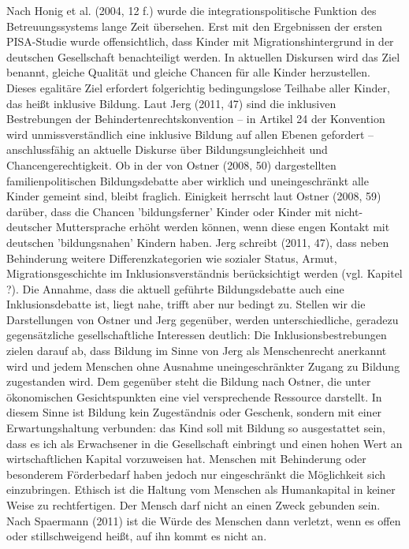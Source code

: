 Nach Honig et al. (2004, 12 f.) wurde die integrationspolitische Funktion des Betreuungssystems lange Zeit übersehen. Erst mit den Ergebnissen der ersten PISA-Studie wurde offensichtlich, dass Kinder mit Migrationshintergrund in der deutschen Gesellschaft benachteiligt werden. In aktuellen Diskursen wird das Ziel benannt, gleiche Qualität und gleiche Chancen für alle Kinder herzustellen. Dieses egalitäre Ziel erfordert folgerichtig bedingungslose Teilhabe aller Kinder, das heißt inklusive Bildung. Laut Jerg (2011, 47) sind die inklusiven Bestrebungen der Behindertenrechtskonvention – in Artikel 24 der Konvention wird unmissverständlich eine inklusive Bildung auf allen Ebenen gefordert – anschlussfähig an aktuelle Diskurse über Bildungsungleichheit und Chancengerechtigkeit. Ob in der von Ostner (2008, 50) dargestellten familienpolitischen Bildungsdebatte aber wirklich und uneingeschränkt alle Kinder gemeint sind, bleibt fraglich. Einigkeit herrscht laut Ostner (2008, 59) darüber, dass die Chancen 'bildungsferner' Kinder oder Kinder mit nicht-deutscher Muttersprache erhöht werden können, wenn diese engen Kontakt mit deutschen 'bildungsnahen' Kindern haben. Jerg schreibt (2011, 47), dass neben Behinderung weitere Differenzkategorien wie sozialer Status, Armut, Migrationsgeschichte im Inklusionsverständnis berücksichtigt werden (vgl. Kapitel ?). Die Annahme, dass die aktuell geführte Bildungsdebatte auch eine Inklusionsdebatte ist, liegt nahe, trifft aber nur bedingt zu. Stellen wir die Darstellungen von Ostner und Jerg gegenüber, werden unterschiedliche, geradezu gegensätzliche gesellschaftliche Interessen deutlich: Die Inklusionsbestrebungen zielen darauf ab, dass Bildung im Sinne von Jerg als Menschenrecht anerkannt wird und jedem Menschen ohne Ausnahme uneingeschränkter Zugang zu Bildung zugestanden wird. Dem gegenüber steht die Bildung nach Ostner, die unter ökonomischen Gesichtspunkten eine viel versprechende Ressource darstellt. In diesem Sinne ist Bildung kein Zugeständnis oder Geschenk, sondern mit einer Erwartungshaltung verbunden: das Kind soll mit Bildung so ausgestattet sein, dass es ich als Erwachsener in die Gesellschaft einbringt und einen hohen Wert an wirtschaftlichen Kapital vorzuweisen hat. Menschen mit Behinderung oder besonderem Förderbedarf haben jedoch nur eingeschränkt die Möglichkeit sich einzubringen. Ethisch ist die Haltung vom Menschen als Humankapital in keiner Weise zu rechtfertigen. Der Mensch darf nicht an einen Zweck gebunden sein. Nach Spaermann (2011) ist die Würde des Menschen dann verletzt, wenn es offen oder stillschweigend heißt, auf ihn kommt es nicht an. 

